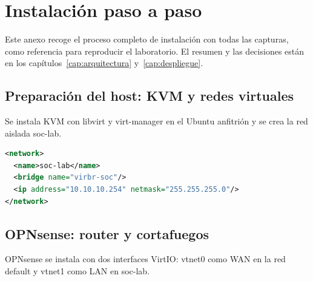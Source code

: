 \chapter{Instalación paso a paso}\label{anx:instalacion}

Este anexo recoge el proceso completo de instalación con todas las capturas,
como referencia para reproducir el laboratorio. El resumen y las decisiones
están en los capítulos~\ref{cap:arquitectura} y~\ref{cap:despliegue}.

\section{Preparación del host: KVM y redes virtuales}\label{sec:a-host}
Se instala KVM con libvirt y virt-manager en el Ubuntu anfitrión y se crea la
red aislada soc-lab.


\begin{nota}
\begin{lstlisting}[language=XML]
<network>
  <name>soc-lab</name>
  <bridge name="virbr-soc"/>
  <ip address="10.10.10.254" netmask="255.255.255.0"/>
</network>
\end{lstlisting}
\end{nota}

\section{OPNsense: router y cortafuegos}\label{sec:a-opnsense}
OPNsense se instala con dos interfaces VirtIO: vtnet0 como WAN en la
red default y vtnet1 como LAN en soc-lab.


